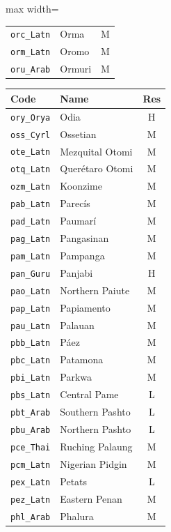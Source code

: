 {\begin{adjustbox}{max width=\textwidth}
\begin{tabular}{llc}
        \texttt{orc\_Latn} & Orma & M \\
        \texttt{orm\_Latn} & Oromo & M \\
        \texttt{oru\_Arab} & Ormuri & M \\
        \bottomrule
    \end{tabular}
    \quad
    \begin{tabular}{llc}
        \toprule
        \textbf{Code} & \textbf{Name} & \textbf{Res}\\
        \midrule
        \texttt{ory\_Orya} & Odia & H \\
        \texttt{oss\_Cyrl} & Ossetian & M \\
        \texttt{ote\_Latn} & Mezquital Otomi & M \\
        \texttt{otq\_Latn} & Querétaro Otomi & M \\
        \texttt{ozm\_Latn} & Koonzime & M \\
        \texttt{pab\_Latn} & Parecís & M \\
        \texttt{pad\_Latn} & Paumarí & M \\
        \texttt{pag\_Latn} & Pangasinan & M \\
        \texttt{pam\_Latn} & Pampanga & M \\
        \texttt{pan\_Guru} & Panjabi & H \\
        \texttt{pao\_Latn} & Northern Paiute & M \\
        \texttt{pap\_Latn} & Papiamento & M \\
        \texttt{pau\_Latn} & Palauan & M \\
        \texttt{pbb\_Latn} & Páez & M \\
        \texttt{pbc\_Latn} & Patamona & M \\
        \texttt{pbi\_Latn} & Parkwa & M \\
        \texttt{pbs\_Latn} & Central Pame & L \\
        \texttt{pbt\_Arab} & Southern Pashto & L \\
        \texttt{pbu\_Arab} & Northern Pashto & L \\
        \texttt{pce\_Thai} & Ruching Palaung & M \\
        \texttt{pcm\_Latn} & Nigerian Pidgin & M \\
        \texttt{pex\_Latn} & Petats & L \\
        \texttt{pez\_Latn} & Eastern Penan & M \\
        \texttt{phl\_Arab} & Phalura & M \\

\end{tabular}
\end{adjustbox}}
